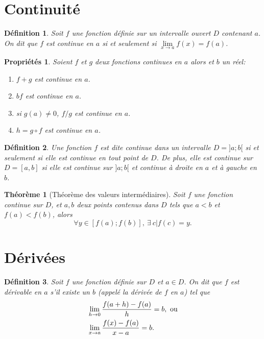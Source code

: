 \documentclass[a4paper,12pt]{book}
\newtheorem{definition}{Définition}
\newtheorem{proprietes}{Propriétés}
\newtheorem{theoreme}{Théorème}
\begin{document}
\section{Continuité}

\begin{definition} 
Soit $f$ une fonction définie sur un intervalle ouvert $D$ contenant $a$. 
On dit que $f$ est continue en $a$ si et seulement si $\lim\limits_{x\rightarrow a}f(x)=f(a)$.
\end{definition}

\begin{proprietes} 
Soient $f$ et $g$ deux fonctions continues en $a$ alors et $b$ un réel:
\begin{enumerate}
\item $f+g$ est continue en $a$.
\item $b f$ est continue en $a$.
\item si $g(a)\neq 0$, $f/g$ est continue en $a$.
\item $h=g\circ f$ est continue en $a$.
\end{enumerate}
\end{proprietes}

\begin{definition} 
Une fonction $f$ est dite continue dans un intervalle $D=]a;b[$ 
si et seulement si elle est continue en tout point de $D$. De plus, elle est 
continue sur $D=[a,b]$ si elle est continue sur $]a;b[$ et continue à droite en $a$
et à gauche en $b$.
\end{definition}

\begin{theoreme} [Théorème des valeurs intermédiaires]
Soit $f$ une fonction continue sur $D$, et $a,b$ deux points contenus dans $D$ tels que $a<b$ et $f(a)<f(b)$, alors 
\begin{equation}
\forall y\in [f(a);f(b)],\ \exists\ c|f(c)=y.
\end{equation}
\end{theoreme}
 

\section{Dérivées}

\begin{definition} Soit $f$ une fonction définie sur $D$ et $a\in D$. On dit que 
$f$ est dérivable en $a$ s'il existe un $b$ (appelé la dérivée de $f$ en $a$) tel que
\begin{align}
&\lim\limits_{h\rightarrow 0}\frac{f(a+h)-f(a)}{h}=b,\hbox{ ou}\\
&\lim\limits_{x\rightarrow a}\frac{f(x)-f(a)}{x-a}=b.
\end{align}
\end{definition}
\end{document}
